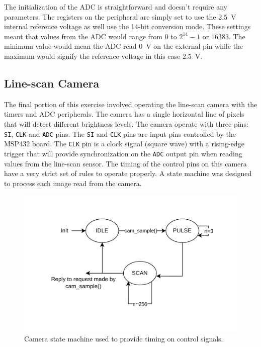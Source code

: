 \documentclass[CMPE]{../KGCOEReport}
\def\code#1{\texttt{#1}}
\begin{document}
	The initialization of the ADC is straightforward and doesn't require any parameters.
	The registers on the peripheral are simply set to use the \SI{2.5}{\volt} internal 
	reference voltage as well use the 14-bit conversion mode. These settings meant that
	values from the ADC would range from $0$ to $2^{14} - 1$ or $16383$. The minimum value
	would mean the ADC read \SI{0}{\volt} on the external pin while the maximum would
	signify the reference voltage in this case \SI{2.5}{\volt}.

	\subsection*{Line-scan Camera}

	The final portion of this exercise involved operating the line-scan camera with the
	timers and ADC peripherals. The camera has a single horizontal line of pixels that will
	detect different brightness levels. The camera operate with three pins:
	\code{SI}, \code{CLK} and \code{ADC} pins. The \code{SI} and \code{CLK} pins
	are input pins controlled by the MSP432 board. The \code{CLK} pin is a clock
	signal (square wave) with a rising-edge trigger that will provide synchronization
	on the \code{ADC} output pin when reading values from the line-scan sensor.
	The timing of the control pins on this camera have a very strict set of rules to
	operate properly. A state machine was designed to process each image read from
	the camera.
	
	\pagebreak

	\begin{figure}[h!]
        \centering
        \includegraphics[width=12cm]{cam_state}
        \caption{Camera state machine used to provide timing on control signals.}
        \label{fig:cam_state}
	\end{figure}
\end{document}
